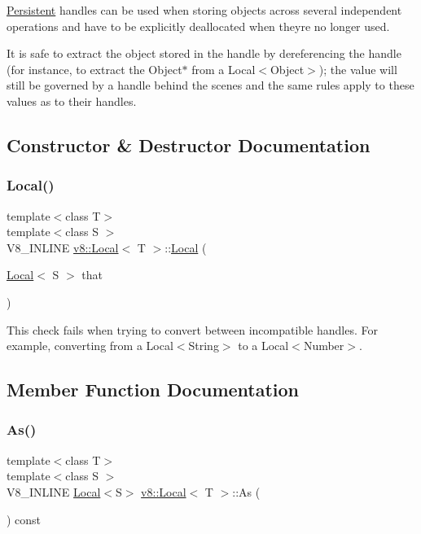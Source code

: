 \mbox{\hyperlink{classv8_1_1Persistent}{Persistent}} handles can be used when storing objects across several independent operations and have to be explicitly deallocated when they\textquotesingle{}re no longer used.

It is safe to extract the object stored in the handle by dereferencing the handle (for instance, to extract the Object$\ast$ from a Local$<$\+Object$>$); the value will still be governed by a handle behind the scenes and the same rules apply to these values as to their handles. 

\subsection{Constructor \& Destructor Documentation}
\mbox{\label{classv8_1_1Local_a18d761713c1062a38f58a568fffe8f80}} 
\subsubsection{\texorpdfstring{Local()}{Local()}}
{\footnotesize\ttfamily template$<$class T$>$ \\
template$<$class S $>$ \\
V8\+\_\+\+I\+N\+L\+I\+NE \mbox{\hyperlink{classv8_1_1Local}{v8\+::\+Local}}$<$ T $>$\+::\mbox{\hyperlink{classv8_1_1Local}{Local}} (\begin{DoxyParamCaption}\item[{\mbox{\hyperlink{classv8_1_1Local}{Local}}$<$ S $>$}]{that }\end{DoxyParamCaption})\hspace{0.3cm}{\ttfamily [inline]}}

This check fails when trying to convert between incompatible handles. For example, converting from a Local$<$\+String$>$ to a Local$<$\+Number$>$.

\subsection{Member Function Documentation}
\mbox{\label{classv8_1_1Local_afa242d21780a729341644a615c4e6ea1}} 
\subsubsection{\texorpdfstring{As()}{As()}}
{\footnotesize\ttfamily template$<$class T$>$ \\
template$<$class S $>$ \\
V8\+\_\+\+I\+N\+L\+I\+NE \mbox{\hyperlink{classv8_1_1Local}{Local}}$<$S$>$ \mbox{\hyperlink{classv8_1_1Local}{v8\+::\+Local}}$<$ T $>$\+::As (\begin{DoxyParamCaption}{ }\end{DoxyParamCaption}) const\hspace{0.3cm}{\ttfamily [inline]}}

